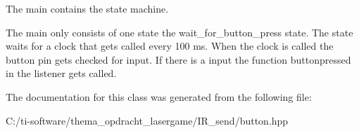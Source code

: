 The main contains the state machine. 

The main only consists of one state the wait\+\_\+for\+\_\+button\+\_\+press state. The state waits for a clock that gets called every 100 ms. When the clock is called the button pin gets checked for input. If there is a input the function buttonpressed in the listener gets called. 

The documentation for this class was generated from the following file\+:\begin{DoxyCompactItemize}
\item 
C\+:/ti-\/software/thema\+\_\+opdracht\+\_\+lasergame/\+I\+R\+\_\+send/button.\+hpp\end{DoxyCompactItemize}
